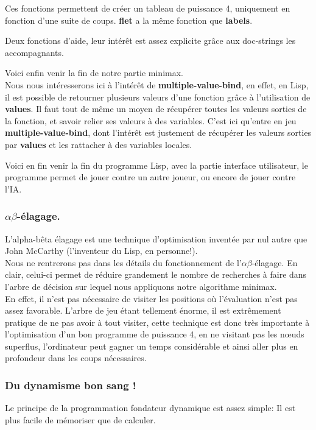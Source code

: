 \documentclass[a4paper, 12pt]{article}
\newcommand{\connect}[1]{
  
}
\numberwithin{equation}{subsection}
\begin{document}
\connect{259-275}
Ces fonctions permettent de créer un tableau de puissance 4, uniquement en fonction d'une suite de coups. {\bf flet} a la même fonction que {\bf labels}.

\connect{277-283}
Deux fonctions d'aide, leur intérêt est assez explicite grâce aux doc-strings les accompagnants.

\connect{291-327}
Voici enfin venir la fin de notre partie minimax. \\

Nous nous intéresserons ici à l'intérêt de {\bf multiple-value-bind}, en effet, en Lisp, il est possible de retourner plusieurs valeurs d'une fonction grâce à l'utilisation de {\bf values}. Il faut tout de même un moyen de récupérer toutes les valeurs sorties de la fonction, et savoir relier ses valeurs à des variables. C'est ici qu'entre en jeu {\bf multiple-value-bind}, dont l'intérêt est justement de récupérer les valeurs sorties par {\bf values} et les rattacher à des variables locales.

\connect{329-363}
Voici en fin venir la fin du programme Lisp, avec la partie interface utilisateur, le programme permet de jouer contre un autre joueur, ou encore de jouer contre l'IA. \\
\subsubsection{$\alpha\beta$-élagage.}
L'alpha-bêta élagage est une technique d'optimisation inventée par nul autre que John McCarthy (l'inventeur du Lisp, en personne!).\\

Nous ne rentrerons pas dans les détails du fonctionnement de l'$\alpha\beta$-élagage. En clair, celui-ci permet de réduire grandement le nombre de recherches à faire dans l'arbre de décision sur lequel nous appliquons notre algorithme minimax.\\

En effet, il n'est pas nécessaire de visiter les positions où l'évaluation n'est pas assez favorable. L'arbre de jeu étant tellement énorme, il est extrêmement pratique de ne pas avoir à tout visiter, cette technique est donc très importante à l'optimisation d'un bon programme de puissance 4, en ne visitant pas les nœuds superflus, l'ordinateur peut gagner un temps considérable et ainsi aller plus en profondeur dans les coups nécessaires.
\subsubsection{Du dynamisme bon sang !}
Le principe de la programmation fondateur dynamique est assez simple: Il est plus facile de mémoriser que de calculer.\\
\end{document}

